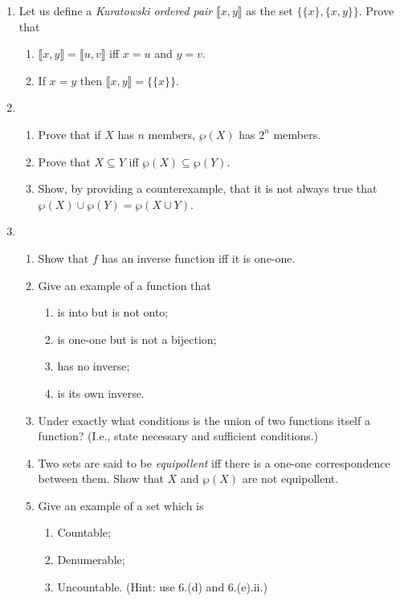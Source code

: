 {\begin{enumerate}
\item Let us define a \emph{Kuratowski ordered pair} $\llbracket x,y\rrbracket$ as the set $\{\{x\},\{x,y\}\}$. Prove that \begin{enumerate} 
	\item $\llbracket x,y\rrbracket = \llbracket u,v\rrbracket$ iff $x=u$ and $y=v$.
	\item If $x=y$ then $\llbracket x,y\rrbracket = \{\{x\}\}$.
\end{enumerate}

\item \begin{enumerate}
	\item Prove that if $X$ has $n$ members, $\wp(X)$ has $2^{n}$ members.
	\item Prove that $X \subseteq Y$ iff $\wp(X) \subseteq \wp(Y)$.
	\item Show, by providing a counterexample, that it is not always true that $\wp(X) \cup \wp(Y) = \wp(X \cup Y)$.
\end{enumerate}

\item \begin{enumerate}
	\item Show that $f$ has an inverse function iff it is one-one.
	\item Give an example of a function that \begin{enumerate}
		\item is into but is not onto;
		\item is one-one but is not a bijection;
		\item has no inverse;
		\item is its own inverse. 
	\end{enumerate}
	\item Under exactly what conditions is the union of two functions itself a function? (I.e., state necessary and sufficient conditions.)
\item Two sets are said to be \emph{equipollent} iff there is a one-one correspondence between them. Show that $X$ and $\wp(X)$ are not equipollent. 
	\item Give an example of a set which is \begin{enumerate}
		\item Countable;
		\item Denumerable;
		\item Uncountable. (Hint: use 6.(d) and 6.(e).ii.)
	\end{enumerate} 
\end{enumerate} 




\end{enumerate}}
